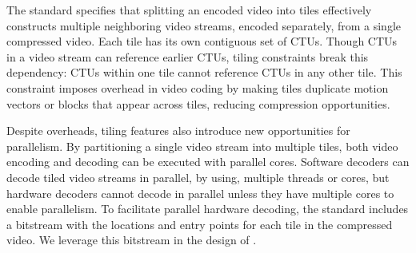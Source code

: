 The \hevc standard specifies that splitting an encoded video into tiles effectively constructs multiple neighboring video streams, encoded separately, from a single compressed video.
Each tile has its own contiguous set of CTUs.
Though CTUs in a video stream can reference earlier CTUs, tiling constraints break this dependency: CTUs within one tile cannot reference CTUs in any other tile.
This constraint imposes overhead in video coding by making tiles duplicate motion vectors or blocks that appear across tiles, reducing compression opportunities.

Despite overheads, tiling features also introduce new opportunities for parallelism.
By partitioning a single video stream into multiple tiles, both video encoding and decoding can be executed with parallel cores.
Software decoders can decode tiled video streams in parallel, by using, multiple threads or cores, but hardware decoders cannot decode in parallel unless they have multiple cores to enable parallelism.
To facilitate parallel hardware decoding, the \hevc standard includes a bitstream with the locations and entry points for each tile in the compressed video.
We leverage this bitstream in the design of \nameArch.
